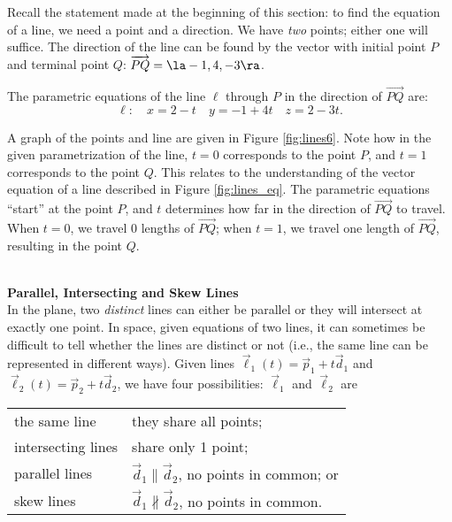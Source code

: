 {Recall the statement made at the beginning of this section: to find the equation of a line, we need a point and a direction. We have \emph{two} points; either one will suffice. The direction of the line can be found by the vector with initial point $P$ and terminal point $Q$: $\overrightarrow{PQ} = \la -1,4,-3\ra$.

The parametric equations of the line $\ell$ through $P$ in the direction of $\overrightarrow{PQ}$ are:
\[
\ell: \quad x= 2-t\quad y=-1+4t \quad z=2-3t.
\]

A graph of the points and line are given in Figure \ref{fig:lines6}. Note how in the given parametrization of the line, $t=0$ corresponds to the point $P$, and $t=1$ corresponds to the point $Q$. This relates to the understanding of the vector equation of a line described in Figure \ref{fig:lines_eq}. The parametric equations ``start'' at the point $P$, and $t$ determines how far in the direction of $\overrightarrow{PQ}$ to travel. When $t=0$, we travel 0 lengths of $\overrightarrow{PQ}$; when $t=1$, we travel one length of $\overrightarrow{PQ}$, resulting in the point $Q$.
}\\

\noindent \textbf{\large Parallel, Intersecting and Skew Lines}\\

In the plane, two \emph{distinct} lines can either be parallel or they will intersect at exactly one point. In space, given equations of two lines, it can sometimes be difficult to tell whether the lines are distinct or not (i.e., the same line can be represented in different ways). Given lines $\vec\ell_1(t) = \vec p_1 + t\vec d_1$ and $\vec \ell_2(t) = \vec p_2+t\vec d_2$, we have four possibilities: $\vec \ell_1$ and $\vec \ell_2$ are

\begin{center}
\begin{tabular}{p{100pt}p{150pt}}
the same line & they share all points; \\
intersecting lines & share only 1 point;\\
parallel lines & $\vec d_1\parallel \vec d_2$, no points in common; or \\
skew lines & $\vec d_1\nparallel \vec d_2$, no points in common. 
\end{tabular}
\end{center}

